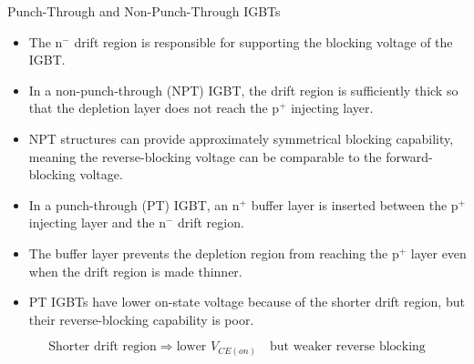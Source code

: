 \begin{frame}{Punch-Through and Non-Punch-Through IGBTs}
\begin{itemize}
    \item The n$^-$ drift region is responsible for supporting the blocking voltage of the IGBT.
    \item In a non-punch-through (NPT) IGBT, the drift region is sufficiently thick so that the depletion layer does not reach the p$^+$ injecting layer.
    \item NPT structures can provide approximately symmetrical blocking capability, meaning the reverse-blocking voltage can be comparable to the forward-blocking voltage.
    \item In a punch-through (PT) IGBT, an n$^+$ buffer layer is inserted between the p$^+$ injecting layer and the n$^-$ drift region.
    \item The buffer layer prevents the depletion region from reaching the p$^+$ layer even when the drift region is made thinner.
    \item PT IGBTs have lower on-state voltage because of the shorter drift region, but their reverse-blocking capability is poor.
\end{itemize}

\[
\text{Shorter drift region} \Rightarrow \text{lower } V_{CE(on)}
\quad \text{but weaker reverse blocking}
\]

\end{frame}


